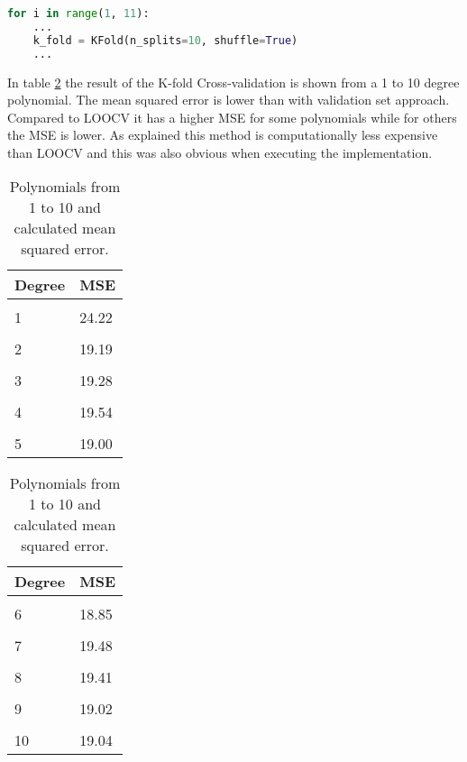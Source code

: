 \begin{lstlisting}[language=Python, label=lst:K_fold, caption=K-fold Cross-validation loop]
for i in range(1, 11):
	...
	k_fold = KFold(n_splits=10, shuffle=True) 
	...
\end{lstlisting}
\FloatBarrier

In table \ref{table:kfold_polynomials_mse} the result of the K-fold Cross-validation is shown from a 1 to 10 degree polynomial. The mean squared error is lower than with validation set approach. Compared to LOOCV it has a higher MSE for some polynomials while for others the MSE is lower. As explained this method is computationally less expensive than LOOCV and this was also obvious when executing the implementation.

\begin{table}[htbp]
	\centering
	\begin{subtable}[t]{2in}
		\centering
		\begin{tabular}{ p{2.5cm} p{1.5cm}  }
			\textbf{Degree} & \textbf{MSE} \\
			\hline 
			\\
			1 & 24.22 \\\hline
			\\
			2 & 19.19 \\\hline
			\\
			3 & 19.28 \\\hline
			\\
			4 & 19.54  \\\hline
			\\
			5 & 19.00  \\\hline
		\end{tabular}
		\label{table:mse_validation}
	\end{subtable}
	\quad 
	\begin{subtable}[t]{2in}
		\centering
		\begin{tabular}{ p{2.5cm} p{1.5cm}  }
			\textbf{Degree} & \textbf{MSE} \\
			\hline 
			\\
			6 & 18.85 \\\hline
			\\
			7 & 19.48  \\\hline
			\\
			8 & 19.41  \\\hline
			\\
			9 & 19.02  \\\hline
			\\
			10 & 19.04  \\\hline
		\end{tabular}
		\label{table:mse_cross}
	\end{subtable}
	\caption{Polynomials from 1 to 10 and calculated mean squared error.}\label{table:kfold_polynomials_mse}
\end{table}


